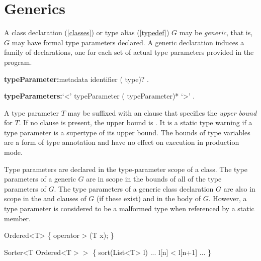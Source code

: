 \documentclass{article}
\begin{document}
\section{Generics}

\LMHash{}
A class declaration (\ref{classes}) or type alias (\ref{typedef})
$G$ may be {\em generic}, that is, $G$ may have formal type parameters declared.
A generic declaration induces a family of declarations, one for each set of actual type parameters provided in the program.

\begin{grammar}
{\bf typeParameter:}metadata identifier (\EXTENDS{} type)?
  .

{\bf typeParameters:}`<' typeParameter (\gcomma{} typeParameter)* `>'
  .
\end{grammar}

\LMHash{}
A type parameter $T$ may be suffixed with an \EXTENDS{} clause that specifies the {\em upper bound} for $T$.
If no \EXTENDS{} clause is present, the upper bound is .
It is a static type warning if a type parameter is a supertype of its upper bound.
The bounds of type variables are a form of type annotation and have no effect on execution in production mode.

\LMHash{}
Type parameters are declared in the type-parameter scope of a class.
The type parameters of a generic $G$ are in scope in the bounds of all of the type parameters of $G$.
The type parameters of a generic class declaration $G$ are also in scope in the \EXTENDS{} and \IMPLEMENTS{} clauses of $G$ (if these exist) and in the body of $G$.
However, a type parameter is considered to be a malformed type when referenced by a static member.



\begin{dartCode}
\CLASS{} Ordered<T> \{
  operator > (T x);
\}

\CLASS{} Sorter<T \EXTENDS{} Ordered<T$>>$ \{
   sort(List<T> l) {... l[n] < l[n+1] ...}
\}

\end{dartCode}
\end{document}
